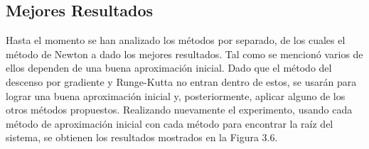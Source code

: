 \subsection{Mejores Resultados}

\par Hasta el momento se han analizado los m\'etodos por separado, de los cuales el m\'etodo de Newton a dado los mejores resultados. Tal como se mencion\'o varios de ellos dependen de una buena aproximaci\'on inicial. Dado que el m\'etodo del descenso por gradiente y Runge-Kutta no entran dentro de estos, se usar\'an para lograr una buena aproximaci\'on inicial y, posteriormente, aplicar alguno de los otros m\'etodos propuestos. Realizando nuevamente el experimento, usando cada m\'etodo de aproximaci\'on inicial con cada m\'etodo para encontrar la ra\'iz del sistema, se obtienen los resultados mostrados en la Figura 3.6.\\

